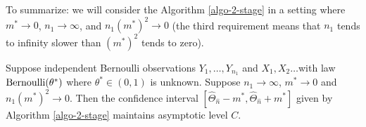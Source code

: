 To summarize: we will consider the Algorithm \ref{algo-2-stage} in a setting
where $m^{\ast }\rightarrow 0$, $n_{1}\rightarrow \infty $, and $n_{1}\left(
m^{\ast }\right) ^{2}\rightarrow 0$ (the third requirement means that $n_{1}$
tends to infinity slower than $\left( m^{\ast }\right) ^{2}$ tends to zero).

\begin{prop}
Suppose independent Bernoulli observations $Y_{1},\ldots ,Y_{n_{1}}$ and $%
X_{1},X_{2}\ldots $with law $\mbox{{\rm Bernoulli}}(\theta^*)$ where $\theta^* \in (0,1)$ is unknown.
Suppose $n_{1}\rightarrow \infty $, $m^{\ast }\rightarrow 0$ and $%
n_{1}\left( m^{\ast }\right) ^{2}\rightarrow 0$. Then the confidence
interval $\left[ \widehat{\Theta}_{\widehat{n}}-m^{\ast },\widehat{\Theta}_{\widehat{n}}+m^{\ast }%
\right] $ given by Algorithm \ref{algo-2-stage} maintains asymptotic level $%
C $.
\end{prop}

